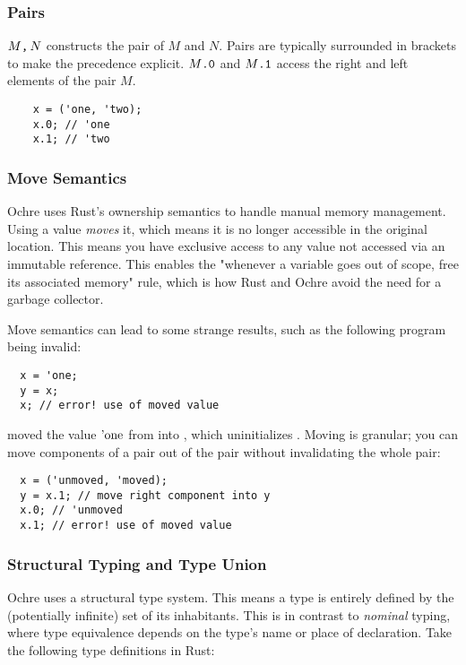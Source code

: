 \documentclass[12pt,twoside]{report}
\begin{document}
\subsubsection{Pairs}
$M \text{\texttt{,}} \, N$ constructs the pair of $M$ and $N$. Pairs are typically surrounded in brackets to make the precedence explicit. $ M\text{\texttt{.0}} $ and $ M\text{\texttt{.1}} $ access the right and left elements of the pair $M$.

  \begin{verbatim}
    x = ('one, 'two);
    x.0; // 'one
    x.1; // 'two
  \end{verbatim}

\subsubsection{Move Semantics}
Ochre uses Rust's ownership semantics to handle manual memory management. Using a value \textit{moves} it, which means it is no longer accessible in the original location. This means you have exclusive access to any value not accessed via an immutable reference. This enables the "whenever a variable goes out of scope, free its associated memory" rule, which is how Rust and Ochre avoid the need for a garbage collector.

Move semantics can lead to some strange results, such as the following program being invalid:

\begin{verbatim}
  x = 'one;
  y = x;
  x; // error! use of moved value
\end{verbatim}

 moved the value $\text{'one}$ from  into , which uninitializes . Moving is granular; you can move components of a pair out of the pair without invalidating the whole pair:

\begin{verbatim}
  x = ('unmoved, 'moved);
  y = x.1; // move right component into y
  x.0; // 'unmoved
  x.1; // error! use of moved value
\end{verbatim}

\subsubsection{Structural Typing and Type Union}
Ochre uses a structural type system. This means a type is entirely defined by the (potentially infinite) set of its inhabitants. This is in contrast to \textit{nominal} typing, where type equivalence depends on the type's name or place of declaration. Take the following type definitions in Rust:
\end{document}
